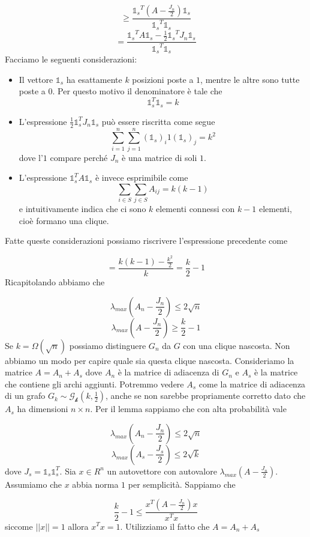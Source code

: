 \documentclass[12pt]{report}
\begin{document}
$$\geq \frac{{\mathds{1}_s}^T(A-\frac{J_n}{2}){\mathds{1}_s}}{{\mathds{1}_s}^T{\mathds{1}_s}} $$
$$= \frac{{\mathds{1}_s}^TA{\mathds{1}_s} - \frac{1}{2} {\mathds{1}_s}^TJ_n{\mathds{1}_s}}{{\mathds{1}_s}^T{\mathds{1}_s}} $$
Facciamo le seguenti considerazioni:

\begin{itemize}
    \item Il vettore $\mathds{1}_s$  ha esattamente $k$ posizioni poste a $1$, mentre le altre sono tutte poste a $0$. Per questo motivo il denominatore è tale che 
    $$\mathds{1}_s^T \mathds{1}_s = k$$
    \item L'espressione $\frac{1}{2}\mathds{1}_s^T J_n \mathds{1}_s$ può essere riscritta come segue
    $$\sum_{i = 1}^n \sum_{j=1}^n (\mathds{1}_s)_i 1 (\mathds{1}_s)_j = k^2$$
    dove l'$1$ compare perché $J_n$ è una matrice di soli $1$.
    \item L'espressione $\mathds{1}_s^T A \mathds{1}_s$ è invece esprimibile come
    $$\sum_{i \in S} \sum_{j \in S} A_{ij} = k(k-1)$$
    e intuitivamente indica che ci sono $k$ elementi connessi con $k-1$ elementi, cioè formano una clique.
\end{itemize}
Fatte queste considerazioni possiamo riscrivere l'espressione precedente come

$$= \frac{k(k-1) - \frac{k^2}{2}}{k} = \frac{k}{2} - 1$$ 
Ricapitolando abbiamo che

$$\lambda_{max}(A_n - \frac{J_n}{2}) \leq 2 \sqrt{n}$$
$$\lambda_{max}(A - \frac{J_n}{2}) \geq \frac{k}{2}-1$$
Se $k = \Omega(\sqrt{n})$ possiamo distinguere $G_n$ da $G$ con una clique nascosta. Non abbiamo un modo per capire quale sia questa clique nascosta. Consideriamo la matrice $A = A_n + A_s$ dove $A_n$ è la matrice di adiacenza di $G_n$ e $A_s$ è la matrice che contiene gli archi aggiunti. Potremmo vedere $A_s$ come la matrice di adiacenza di un grafo $G_k \sim \mathcal{G_k}(k,\frac{1}{2})$, anche se non sarebbe propriamente corretto dato che $A_s$ ha dimensioni $n \times n$. Per il lemma sappiamo che con alta probabilità vale

$$\lambda_{max}(A_n - \frac{J_n}{2}) \leq 2 \sqrt{n}$$
$$\lambda_{max}(A_s - \frac{J_s}{2}) \leq 2 \sqrt{k}$$
dove $J_s = \mathds{1}_s \mathds{1}_s^T$. Sia $x \in R^n$ un autovettore con autovalore $\lambda_{max}(A-\frac{J_n}{2})$. Assumiamo che $x$ abbia norma $1$ per semplicità. Sappiamo che

$$\frac{k}{2}-1 \leq \frac{x^T (A - \frac{J_n}{2}) x}{x^T x}$$
siccome $||x|| = 1$ allora $x^T x = 1$. Utilizziamo il fatto che $A = A_n + A_s$
\end{document}
